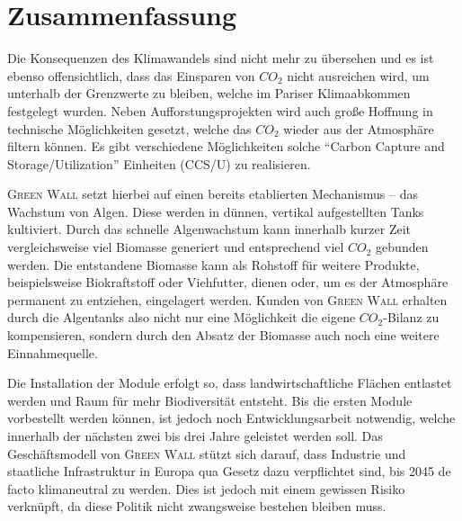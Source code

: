 \chapter{Zusammenfassung}

Die Konsequenzen des Klimawandels sind nicht mehr zu übersehen und es ist ebenso offensichtlich, dass das Einsparen von \(CO_2\) nicht ausreichen wird, um unterhalb der Grenzwerte zu bleiben, welche im Pariser Klimaabkommen festgelegt wurden. 
Neben Aufforstungsprojekten wird auch große Hoffnung in technische Möglichkeiten gesetzt, welche das \(CO_2\) wieder aus der Atmosphäre filtern können. 
Es gibt verschiedene Möglichkeiten solche ``Carbon Capture and Storage/Utilization'' Einheiten (CCS/U) zu realisieren.\par\medskip
%
\textsc{Green Wall} setzt hierbei auf einen bereits etablierten Mechanismus -- das Wachstum von Algen.
Diese werden in dünnen, vertikal aufgestellten Tanks kultiviert.
Durch das schnelle Algenwachstum kann innerhalb kurzer Zeit vergleichsweise viel Biomasse generiert und entsprechend viel \(CO_2\) gebunden werden.
Die entstandene Biomasse kann als Rohstoff für weitere Produkte, beispielsweise Biokraftstoff oder Viehfutter, dienen oder, um es der Atmosphäre permanent zu entziehen, eingelagert werden.
Kunden von \textsc{Green Wall} erhalten durch die Algentanks also nicht nur eine Möglichkeit die eigene \(CO_2\)-Bilanz zu kompensieren, sondern durch den Absatz der Biomasse auch noch eine weitere Einnahmequelle.\par\medskip
%
Die Installation der Module erfolgt so, dass landwirtschaftliche Flächen entlastet werden und Raum für mehr Biodiversität entsteht.
Bis die ersten Module vorbestellt werden können, ist jedoch noch Entwicklungsarbeit notwendig, welche innerhalb der nächsten zwei bis drei Jahre geleistet werden soll.
Das Geschäftsmodell von \textsc{Green Wall} stützt sich darauf, dass Industrie und staatliche Infrastruktur in Europa qua Gesetz dazu verpflichtet sind, bis 2045 de facto klimaneutral zu werden.
Dies ist jedoch mit einem gewissen Risiko verknüpft, da diese Politik nicht zwangsweise bestehen bleiben muss.
